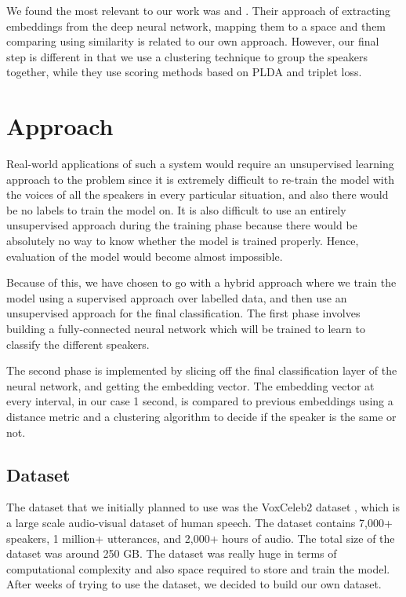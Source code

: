 \documentclass[10pt,twocolumn,letterpaper]{article}
\begin{document}
We found the most relevant to our work was \cite{li2017deep} and \cite{deep}. Their approach of extracting embeddings from the deep neural network, mapping them to a space and them comparing using similarity is related to our own approach. However, our final step is different in that we use a clustering technique to group the speakers together, while they use scoring methods based on PLDA and triplet loss.


\section{Approach}

Real-world applications of such a system would require an unsupervised learning approach to the problem since it is extremely difficult to re-train the model with the voices of all the speakers in every particular situation, and also there would be no labels to train the model on. It is also difficult to use an entirely unsupervised approach during the training phase because there would be absolutely no way to know whether the model is trained properly. Hence, evaluation of the model would become almost impossible.

Because of this, we have chosen to go with a hybrid approach where we train the model using a supervised approach over labelled data, and then use an unsupervised approach for the final classification. The first phase involves building a fully-connected neural network which will be trained to learn to classify the different speakers. 

The second phase is implemented by slicing off the final classification layer of the neural network, and getting the embedding vector. The embedding vector at every interval, in our case 1 second, is compared to previous embeddings using a distance metric and a clustering algorithm  to decide if the speaker is the same or not.

\subsection{Dataset}

The dataset that we initially planned to use was the VoxCeleb2 dataset \cite{base}, which is a large scale audio-visual dataset of human speech. The dataset contains 7,000+ speakers, 1 million+ utterances, and 2,000+ hours of audio. The total size of the dataset was around 250 GB. The dataset was really huge in terms of computational complexity and also space required to store and train the model. After weeks of trying to use the dataset, we decided to build our own dataset. 
\end{document}

